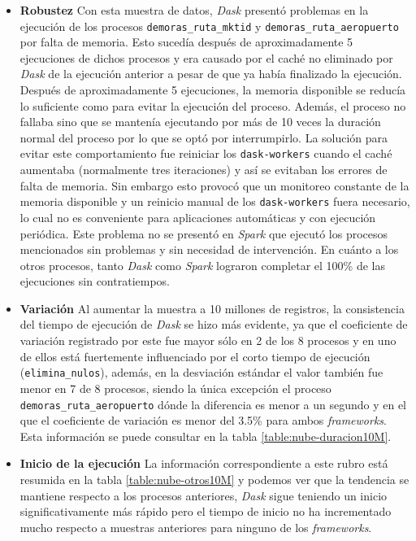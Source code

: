 \begin{itemize}
	\item \textbf{Robustez} Con esta muestra de datos, \textit{Dask} presentó problemas en la ejecución de los procesos \texttt{demoras\_ruta\_mktid} y \texttt{demoras\_ruta\_aeropuerto} por falta de memoria. Esto sucedía después de aproximadamente 5 ejecuciones de dichos procesos y era causado por el caché no eliminado por \textit{Dask} de la ejecución anterior a pesar de que ya había finalizado la ejecución. Después de aproximadamente 5 ejecuciones, la memoria disponible se reducía lo suficiente como para evitar la ejecución del proceso. Además, el proceso no fallaba sino que se mantenía ejecutando por más de 10 veces la duración normal del proceso por lo que se optó por interrumpirlo. La solución para evitar este comportamiento fue reiniciar los \texttt{dask-workers} cuando el caché aumentaba (normalmente tres iteraciones) y así se evitaban los errores de falta de memoria. Sin embargo esto provocó que un monitoreo constante de la memoria disponible y un reinicio manual de los \texttt{dask-workers} fuera necesario, lo cual no es conveniente para aplicaciones automáticas y con ejecución periódica. Este problema no se presentó en \textit{Spark} que ejecutó los procesos mencionados sin problemas y sin necesidad de intervención. En cuánto a los otros procesos, tanto \textit{Dask} como \textit{Spark} lograron completar el 100\% de las ejecuciones sin contratiempos.

	\item \textbf{Variación} Al aumentar la muestra a 10 millones de registros, la consistencia del tiempo de ejecución de \textit{Dask} se hizo más evidente, ya que el coeficiente de variación registrado por este fue mayor sólo en 2 de los 8 procesos y en uno de ellos está fuertemente influenciado por el corto tiempo de ejecución (\texttt{elimina\_nulos}), además, en la desviación estándar el valor también fue menor en 7 de 8 procesos, siendo la única excepción el proceso \texttt{demoras\_ruta\_aeropuerto} dónde la diferencia es menor a un segundo y en el que el coeficiente de variación es menor del 3.5\% para ambos \textit{frameworks}. Esta información se puede consultar en la tabla \ref{table:nube-duracion10M}.
	
	\item \textbf{Inicio de la ejecución} La información correspondiente a este rubro está resumida en la tabla \ref{table:nube-otros10M} y podemos ver que la tendencia se mantiene respecto a los procesos anteriores, \textit{Dask} sigue teniendo un inicio significativamente más rápido pero el tiempo de inicio no ha incrementado mucho respecto a muestras anteriores para ninguno de los \textit{frameworks}.
	

\end{itemize}
